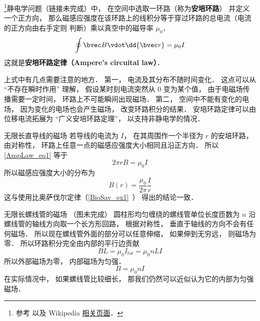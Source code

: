 
\begin{issues}
\end{issues}


\footnote{参考 \cite{GriffE} 以及 Wikipedia \href{https://en.wikipedia.org/wiki/Ampère's_circuital_law}{相关页面}．}静电学问题（链接未完成）中， 在空间中选取一环路（称为\textbf{安培环路}） 并定义一个正方向， 那么磁感应强度在该环路上的线积分等于穿过环路的总电流（电流的正方向由右手定则 判断）乘以真空中的磁导率 $\mu_0$．
\begin{equation}\label{AmpLaw_eq1}
\oint \bvec B \vdot \dd{\bvec r} = \mu_0 I
\end{equation}
这就是\textbf{安培环路定律（Ampere's circuital law）}．

上式中有几点需要注意的地方． 第一， 电流及其分布不随时间变化． 这点可以从 “不存在瞬时作用” 理解， 假设某时刻电流突然从 0 变为某个值， 由于电磁场传播需要一定时间， 环路上不可能瞬间出现磁场． 第二， 空间中不能有变化的电场， 因为变化的电场也会产生磁场， 改变环路积分的结果． 安培环路定律可以由位移电流拓展为 “广义安培环路定理”， 以支持非静电学的情况．

\begin{example}{无限长直导线的磁场}\label{AmpLaw_ex1}
若导线的电流为 $I$， 在其周围作一个半径为 $r$ 的安培环路， 由对称性， 环路上任意一点的磁感应强度大小相同且沿正方向． 所以\autoref{AmpLaw_eq1} 等于
\begin{equation}
2\pi r B = \mu_0 I
\end{equation}
所以磁感应强度大小的分布为
\begin{equation}
B(r) = \frac{\mu_0}{2\pi} \frac Ir
\end{equation}
这与使用比奥萨伐尔定律（\autoref{BioSav_ex1}~） 得出的结论一致．
\end{example}

\begin{example}{无限长螺线管的磁场}\label{AmpLaw_ex2}
（图未完成） 
圆柱形均匀缠绕的螺线管单位长度匝数为 $n$ 沿螺线管的轴线方向取一个长方形回路， 根据对称性， 垂直于轴线的方向不会有任何磁场． 所以现在螺线管外面的部分可以任意伸缩， 如果伸到无穷远， 则磁场为零． 所以环路积分完全由内部的平行边贡献
\begin{equation}
BL = \mu_0 I_{tot} = \mu_0 nLI
\end{equation}
所以外部磁场为零， 内部磁场为匀强．
\begin{equation}
B = \mu_0 nI
\end{equation}
在实际情况中， 如果螺线管比较细长， 那我们仍然可以近似认为它的内部为匀强磁场．
\end{example}

